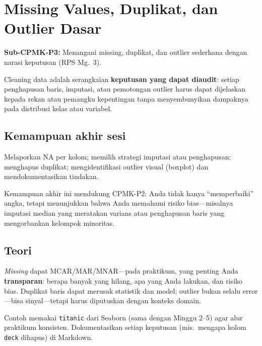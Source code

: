 \documentclass[../main.tex]{subfiles}
\begin{document}
\chapter{Missing Values, Duplikat, dan Outlier Dasar}

\begin{subcpmk}
  \item \textbf{Sub-CPMK-P3:} Menangani missing, duplikat, dan outlier sederhana dengan narasi keputusan (RPS Mg.\ 3).
\end{subcpmk}


\noindent Cleaning data adalah serangkaian \textbf{keputusan yang dapat diaudit}: setiap penghapusan baris, imputasi, atau pemotongan outlier harus dapat dijelaskan kepada rekan atau pemangku kepentingan tanpa menyembunyikan dampaknya pada distribusi kelas atau variabel.

\section{Kemampuan akhir sesi}

Melaporkan NA per kolom; memilih strategi imputasi atau penghapusan; menghapus duplikat; mengidentifikasi outlier visual (boxplot) dan mendokumentasikan tindakan.

Kemampuan akhir ini mendukung CPMK-P2: Anda tidak hanya ``memperbaiki'' angka, tetapi menunjukkan bahwa Anda memahami risiko bias---misalnya imputasi median yang meratakan varians atau penghapusan baris yang mengorbankan kelompok minoritas.

\section{Teori}

\begin{konsep}
\textit{Missing} dapat MCAR/MAR/MNAR---pada praktikum, yang penting Anda \textbf{transparan}: berapa banyak yang hilang, apa yang Anda lakukan, dan risiko bias. Duplikat baris dapat merusak statistik dan model; outlier bukan selalu error---bisa sinyal---tetapi harus diputuskan dengan konteks domain.
\end{konsep}

\begin{catatan}
Contoh memakai \texttt{titanic} dari Seaborn (sama dengan Minggu 2--5) agar alur praktikum konsisten. Dokumentasikan setiap keputusan (mis.\ mengapa kolom \texttt{deck} dihapus) di Markdown.
\end{catatan}
\end{document}
